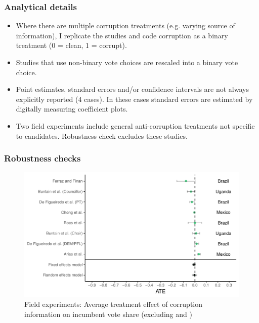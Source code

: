 \documentclass[usenames,dvipsnames]{beamer}
\begin{document}
\begin{frame}[label=details]
\frametitle{Analytical details}
\begin{itemize}
\item Where there are multiple corruption treatments (e.g. varying source of information), I replicate the studies and code corruption as a binary treatment (0 = clean, 1 = corrupt).
\pause
\item Studies that use non-binary vote choices are rescaled into a binary vote choice.
\pause
\item Point estimates, standard errors and/or confidence intervals are not always explicitly reported (4 cases). In these cases standard errors are estimated by digitally measuring coefficient plots.
\pause
\item Two field experiments include general anti-corruption treatments not specific to candidates. Robustness check excludes these studies. 
\end{itemize}
\end{frame}


\begin{frame}[label=supplemental]
\frametitle{Robustness checks}

\begin{figure}[!hb]
\hspace*{-11mm}
\includegraphics[scale = 0.75]{../figs/field_no_banerjee.pdf}
\vspace{-0.2cm}
\caption{Field experiments: Average treatment effect of corruption information on incumbent vote share (excluding \cite{banerjee2010can} and \citet{banerjee2011informed})}
\small
\vspace{-0.5cm}
\label{fig: field_no_banerjee}
\end{figure}
\end{frame}
\end{document}
